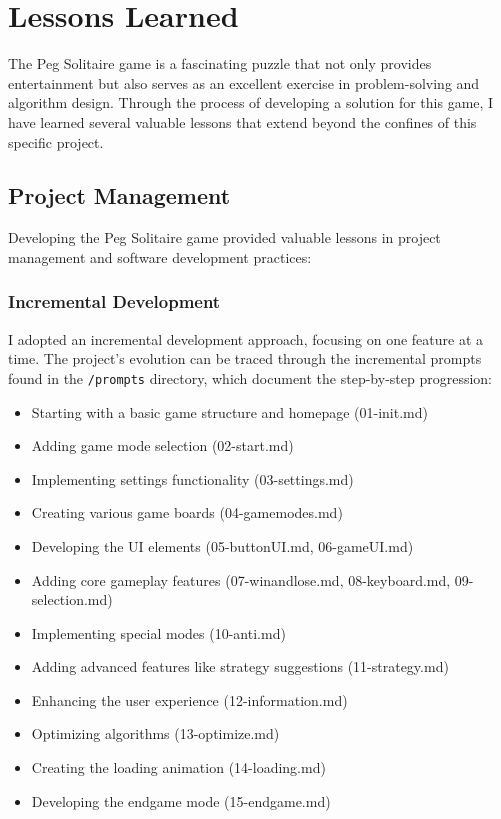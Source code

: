 \section{Lessons Learned}
\label{sec:lessons-learned}

The Peg Solitaire game is a fascinating puzzle that not only provides entertainment but also serves as an excellent exercise in problem-solving and algorithm design. Through the process of developing a solution for this game, I have learned several valuable lessons that extend beyond the confines of this specific project.

\subsection{Project Management}
Developing the Peg Solitaire game provided valuable lessons in project management and software development practices:

\subsubsection{Incremental Development}
I adopted an incremental development approach, focusing on one feature at a time. The project's evolution can be traced through the incremental prompts found in the \texttt{/prompts} directory, which document the step-by-step progression:

\begin{itemize}
    \item Starting with a basic game structure and homepage (01-init.md)
    \item Adding game mode selection (02-start.md)
    \item Implementing settings functionality (03-settings.md)
    \item Creating various game boards (04-gamemodes.md)
    \item Developing the UI elements (05-buttonUI.md, 06-gameUI.md)
    \item Adding core gameplay features (07-winandlose.md, 08-keyboard.md, 09-selection.md)
    \item Implementing special modes (10-anti.md)
    \item Adding advanced features like strategy suggestions (11-strategy.md)
    \item Enhancing the user experience (12-information.md)
    \item Optimizing algorithms (13-optimize.md)
    \item Creating the loading animation (14-loading.md)
    \item Developing the endgame mode (15-endgame.md)
\end{itemize}

